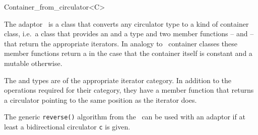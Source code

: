 \begin{ccClassTemplate}{Container_from_circulator<C>}

\ccDefinition

The adaptor \ccClassTemplateName\ is a class that converts any
circulator type  to a kind of container class, i.e.~a class
that provides an  and a 
type and two member functions --  and 
-- that return the appropriate iterators. In analogy to \stl\ 
container classes these member functions return a 
in the case that the container itself is constant and a mutable
 otherwise.


\ccTypes


\ccGlue
{}

\ccCreation




\ccOperations

\def\ccTagRmTrailingConst{\ccFalse}

\ccGlue
{}
\ccGlue
{}
\ccGlue
{}
\def\ccTagRmTrailingConst{\ccTrue}

The  and  types are of the
appropriate iterator category. In addition to the operations required
for their category, they have a member function
 that returns a circulator pointing to the
same position as the iterator does.

\ccExample

The generic {\tt reverse()} algorithm from the \stl\ can be used with an
adaptor if at least a bidirectional circulator {\tt c} is given.


\end{ccClassTemplate}
